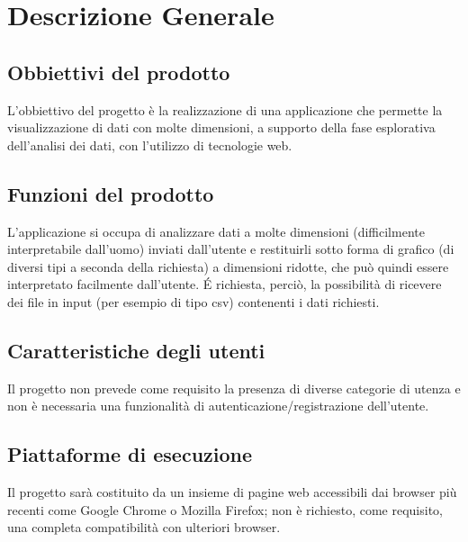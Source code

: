 \section{Descrizione Generale}
\subsection{Obbiettivi del prodotto}
L'obbiettivo del progetto è la realizzazione di una applicazione che permette la visualizzazione di dati con molte dimensioni, a supporto della fase esplorativa dell'analisi dei dati, con l'utilizzo di tecnologie web.
\subsection{Funzioni del prodotto}
L'applicazione si occupa di analizzare dati a molte dimensioni (difficilmente interpretabile dall'uomo) inviati dall'utente e restituirli sotto forma di grafico (di diversi tipi a seconda della richiesta) a dimensioni ridotte, che può quindi essere interpretato facilmente dall'utente. \'E richiesta, perciò, la possibilità di ricevere dei file in input (per esempio di tipo csv) contenenti i dati richiesti.
\subsection{Caratteristiche degli utenti}
Il progetto non prevede come requisito la presenza di diverse categorie di utenza e non è necessaria una funzionalità di autenticazione/registrazione dell'utente.
\subsection{Piattaforme di esecuzione}
Il progetto sarà costituito da un insieme di pagine web accessibili dai browser più recenti come Google Chrome o Mozilla Firefox; non è richiesto, come requisito, una completa compatibilità con ulteriori browser.
